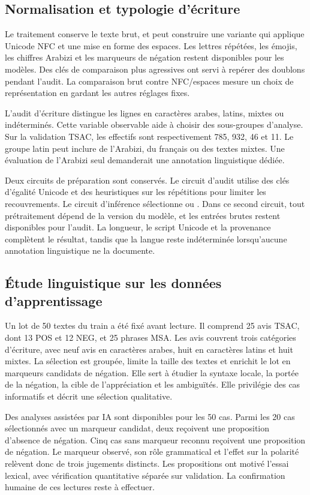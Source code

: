 \subsection{Normalisation et typologie d’écriture}
Le traitement conserve le texte brut, et peut construire une variante qui applique Unicode NFC et une mise en forme des espaces. Les lettres répétées, les émojis, les chiffres Arabizi et les marqueurs de négation restent disponibles pour les modèles. Des clés de comparaison plus agressives ont servi à repérer des doublons pendant l’audit. La comparaison brut contre NFC/espaces mesure un choix de représentation en gardant les autres réglages fixes.

L’audit d’écriture distingue les lignes en caractères arabes, latins, mixtes ou indéterminés. Cette variable observable aide à choisir des sous-groupes d’analyse. Sur la validation TSAC, les effectifs sont respectivement 785, 932, 46 et 11. Le groupe latin peut inclure de l’Arabizi, du français ou des textes mixtes. Une évaluation de l’Arabizi seul demanderait une annotation linguistique dédiée.

Deux circuits de préparation sont conservés. Le circuit d’audit utilise des clés d’égalité Unicode et des heuristiques sur les répétitions pour limiter les recouvrements. Le circuit d’inférence sélectionne  ou . Dans ce second circuit, tout prétraitement dépend de la version du modèle, et les entrées brutes restent disponibles pour l’audit. La longueur, le script Unicode et la provenance complètent le résultat, tandis que la langue reste indéterminée lorsqu’aucune annotation linguistique ne la documente.

\subsection{Étude linguistique sur les données d’apprentissage}
Un lot de 50 textes du train a été fixé avant lecture. Il comprend 25 avis TSAC, dont 13 POS et 12 NEG, et 25 phrases MSA. Les avis couvrent trois catégories d’écriture, avec neuf avis en caractères arabes, huit en caractères latins et huit mixtes. La sélection est groupée, limite la taille des textes et enrichit le lot en marqueurs candidats de négation. Elle sert à étudier la syntaxe locale, la portée de la négation, la cible de l’appréciation et les ambiguïtés. Elle privilégie des cas informatifs et décrit une sélection qualitative.

Des analyses assistées par IA sont disponibles pour les 50 cas. Parmi les 20 cas sélectionnés avec un marqueur candidat, deux reçoivent une proposition d’absence de négation. Cinq cas sans marqueur reconnu reçoivent une proposition de négation. Le marqueur observé, son rôle grammatical et l’effet sur la polarité relèvent donc de trois jugements distincts. Les propositions ont motivé l’essai lexical, avec vérification quantitative séparée sur validation. La confirmation humaine de ces lectures reste à effectuer.

